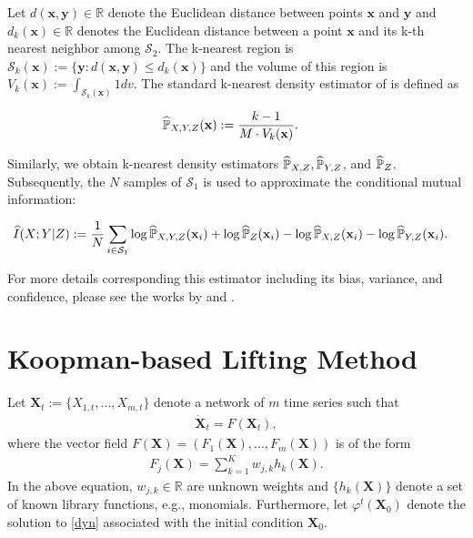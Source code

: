 Let $d(\textbf{x},\textbf{y})\in\mathbb{R}$ denote the Euclidean distance between points $\textbf{x}$ and $\textbf{y}$ and $d_k(\textbf{x})\in\mathbb{R}$ denotes the Euclidean distance between a point $\textbf{x}$ and its k-th nearest neighbor among
$\mathcal{S}_2$. The k-nearest region is $\mathcal{S}_k(\textbf{x}) := \{\textbf{y} :d(\textbf{x},\textbf{y})\leq d_k(\textbf{x}) \}$ and the volume of this region is $V_k(\textbf{x}):=\int_{\mathcal{S}_k(\textbf{x})}1dv$. The standard k-nearest density estimator of \cite{sricharan2011k} is defined as 
\begin{small}
\begin{align*}
&\widehat{\operatorname{{\mathbb{P}}}}_{X,Y,Z}(\textbf{x}):=\frac{k-1}{M\cdot V_k(\textbf{x})}.
\end{align*}
\end{small}
Similarly, we obtain k-nearest density estimators $\widehat{\operatorname{{\mathbb{P}}}}_{X,Z}, \widehat{\operatorname{{\mathbb{P}}}}_{Y,Z}$, and $\widehat{\operatorname{{\mathbb{P}}}}_{Z}$.
Subsequently, the $N$ samples of $\mathcal{S}_1$ is used to approximate the conditional mutual information:
\begin{small}
\begin{align*}
&\widehat{I}(X;Y|Z):=\frac{1}{N}\sum_{i\in \mathcal{S}_1} \log \widehat{\operatorname{{\mathbb{P}}}}_{X,Y,Z}(\textbf{x}_i) + \log \widehat{\operatorname{{\mathbb{P}}}}_{Z}(\textbf{x}_i) -\log \widehat{\operatorname{{\mathbb{P}}}}_{X,Z}(\textbf{x}_i) -\log \widehat{\operatorname{{\mathbb{P}}}}_{Y,Z}(\textbf{x}_i).
\end{align*}
\end{small}
For more details corresponding this estimator including its bias, variance, and confidence, please see the works by \cite{sricharan2011k} and \cite{loftsgaarden1965nonparametric}.


\section{Koopman-based Lifting Method}
Let $\textbf{X}_t:=\{X_{1,t}, ..., X_{m,t}\}$ denote a network of $m$ time series such that 
\begin{align}\label{dyn}
\dot{\textbf{X}}_t = F(\textbf{X}_t),
\end{align}
where the vector field $F(\textbf{X})=(F_1(\textbf{X}),...,F_m(\textbf{X}))$ is of the form
\begin{align}
F_j(\textbf{X})= \sum_{k=1}^K w_{j,k} h_k(\textbf{X}).
\end{align}
In the above equation, $w_{j,k}\in\mathbb{R}$ are unknown weights and $\{h_k(\textbf{X})\}$ denote a set of known library functions, e.g., monomials. 
Furthermore, let $\varphi^t(\textbf{X}_0)$ denote the solution to \eqref{dyn} associated with the initial condition $\textbf{X}_0$. 

